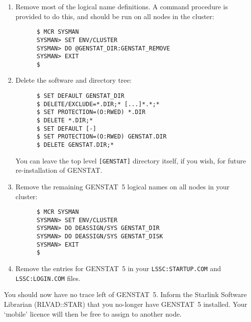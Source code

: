 \begin{enumerate}
\item Remove most of the logical name definitions. A command procedure is
provided to do this, and should be run on all nodes in the cluster:
\begin{verbatim}
      $ MCR SYSMAN
      SYSMAN> SET ENV/CLUSTER
      SYSMAN> DO @GENSTAT_DIR:GENSTAT_REMOVE
      SYSMAN> EXIT
      $
\end{verbatim}
\item Delete the software and directory tree:
\begin{verbatim}
      $ SET DEFAULT GENSTAT_DIR
      $ DELETE/EXCLUDE=*.DIR;* [...]*.*;*
      $ SET PROTECTION=(O:RWED) *.DIR
      $ DELETE *.DIR;*
      $ SET DEFAULT [-]
      $ SET PROTECTION=(O:RWED) GENSTAT.DIR
      $ DELETE GENSTAT.DIR;*
\end{verbatim}
You can leave the top level {\tt [GENSTAT]} directory itself, if you wish, for
future re-installation of GENSTAT.

\item Remove the remaining GENSTAT~5 logical names on all nodes in your
cluster:
\begin{verbatim}
      $ MCR SYSMAN
      SYSMAN> SET ENV/CLUSTER
      SYSMAN> DO DEASSIGN/SYS GENSTAT_DIR
      SYSMAN> DO DEASSIGN/SYS GENSTAT_DISK
      SYSMAN> EXIT
      $
\end{verbatim}
\item Remove the entries for GENSTAT~5 in your {\tt LSSC:STARTUP.COM} and
{\tt LSSC:LOGIN.COM} files.
\end{enumerate}

You should now have no trace left of GENSTAT~5. Inform the Starlink Software
Librarian (RLVAD::STAR) that you no-longer have GENSTAT~5 installed. Your
`mobile' licence will then be free to assign to another node.

